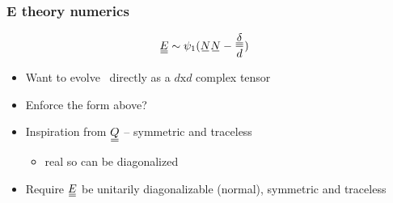 \documentclass[10pt,mathserif]{beamer}
\begin{document}
\begin{frame}
    \frametitle{E theory numerics}
    \begin{align*}
        \du{E} &\sim \psi_1(\su{N}\su{N} - \frac{\du{\delta}}{d})
    \end{align*}
    \begin{itemize}
        \item Want to evolve \EE\ directly as a $d\text{x}d$ complex tensor
        \item Enforce the form above?
        \item Inspiration from $\du{Q}$ -- symmetric and traceless 
        \begin{itemize}
            \item real so can be diagonalized
        \end{itemize}
        \item Require $\du{E}$ be unitarily diagonalizable (normal), symmetric and traceless
    \end{itemize}
\end{frame}
\end{document}

